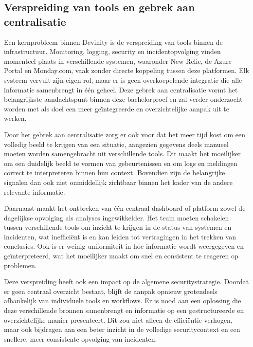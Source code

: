 
\subsection{Verspreiding van tools en gebrek aan centralisatie}
Een kernprobleem binnen Devinity is de verspreiding van tools binnen de infrastructuur. Monitoring, logging, security en incidentopvolging vinden momenteel plaats in verschillende systemen, waaronder New Relic, de Azure Portal en Monday.com, vaak zonder directe koppeling tussen deze platformen. Elk systeem vervult zijn eigen rol, maar er is geen overkoepelende integratie die alle informatie samenbrengt in één geheel. Deze gebrek aan centralisatie vormt het belangrijkste aandachtspunt binnen deze bachelorproef en zal verder onderzocht worden met als doel een meer geïntegreerde en overzichtelijke aanpak uit te werken.

Door het gebrek aan centralisatie zorg er ook voor dat het meer tijd kost om een volledig beeld te krijgen van een situatie, aangezien gegevens deels manueel moeten worden samengebracht uit verschillende tools. Dit maakt het moeilijker om een duidelijk beeld te vormen van gebeurtenissen en om logs en meldingen correct te interpreteren binnen hun context. Bovendien zijn de belangrijke signalen dan ook niet onmiddellijk zichtbaar binnen het kader van de andere relevante informatie.

Daarnaast maakt het ontbreken van één centraal dashboard of platform zowel de dagelijkse opvolging als analyses ingewikkelder. Het team moeten schakelen tussen verschillende tools om inzicht te krijgen in de status van systemen en incidenten, wat inefficiënt is en kan leiden tot vertragingen in het trekken van conclusies. Ook is er weinig uniformiteit in hoe informatie wordt weergegeven en geïnterpreteerd, wat het moeilijker maakt om snel en consistent te reageren op problemen.

Deze verspreiding heeft ook een impact op de algemene securitystrategie. Doordat er geen centraal overzicht bestaat, blijft de aanpak opnieuw grotendeels afhankelijk van individuele tools en workflows. Er is nood aan een oplossing die deze verschillende bronnen samenbrengt en informatie op een gestructureerde en overzichtelijke manier presenteert. Dit zou niet alleen de efficiëntie verhogen, maar ook bijdragen aan een beter inzicht in de volledige securitycontext en een snellere, meer consistente opvolging van incidenten.


